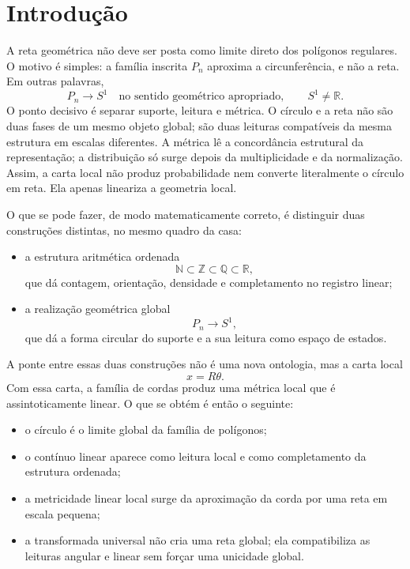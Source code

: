 \documentclass[11pt,a4paper]{article}
\begin{document}
\section{Introdução}

A reta geométrica não deve ser posta como limite direto dos polígonos regulares. O motivo é simples: a família inscrita $P_n$ aproxima a circunferência, e não a reta. Em outras palavras,
\[
P_n \longrightarrow S^1
\quad\text{no sentido geométrico apropriado},\qquad S^1\neq\mathbb R.
\]
O ponto decisivo é separar suporte, leitura e métrica. O círculo e a reta não são duas fases de um mesmo objeto global; são duas leituras compatíveis da mesma estrutura em escalas diferentes. A métrica lê a concordância estrutural da representação; a distribuição só surge depois da multiplicidade e da normalização. Assim, a carta local não produz probabilidade nem converte literalmente o círculo em reta. Ela apenas lineariza a geometria local.

O que se pode fazer, de modo matematicamente correto, é distinguir duas construções distintas, no mesmo quadro da casa:

\begin{itemize}[leftmargin=1.5em]
\item a estrutura aritmética ordenada
\[
\mathbb N\subset\mathbb Z\subset\mathbb Q\subset\mathbb R,
\]
que dá contagem, orientação, densidade e completamento no registro linear;
\item a realização geométrica global
\[
P_n\longrightarrow S^1,
\]
que dá a forma circular do suporte e a sua leitura como espaço de estados.
\end{itemize}

A ponte entre essas duas construções não é uma nova ontologia, mas a carta local
\[
 x=R\theta.
\]
Com essa carta, a família de cordas produz uma métrica local que é assintoticamente linear. O que se obtém é então o seguinte:

\begin{itemize}[leftmargin=1.5em]
\item o círculo é o limite global da família de polígonos;
\item o contínuo linear aparece como leitura local e como completamento da estrutura ordenada;
\item a metricidade linear local surge da aproximação da corda por uma reta em escala pequena;
\item a transformada universal não cria uma reta global; ela compatibiliza as leituras angular e linear sem forçar uma unicidade global.
\end{itemize}
\end{document}
